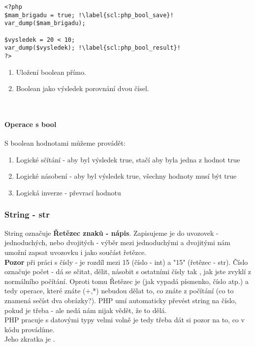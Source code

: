 \begin{minipage}[t]{.45\textwidth}
\begin{code}
\begin{verbatim}
<?php 
$mam_brigadu = true; !\label{scl:php_bool_save}!
var_dump($mam_brigadu);

$vysledek = 20 < 10;
var_dump($vysledek); !\label{scl:php_bool_result}!
?>
\end{verbatim}

\label{code:typy_bool}
\end{code}
\end{minipage}
\begin{minipage}[t]{.45\textwidth}
\begin{enumerate}
\item[ř. \ref{scl:php_bool_save}:] Uložení boolean přímo.
\item[ř. \ref{scl:php_bool_save}:] Boolean jako výsledek porovnání dvou čísel.
\end{enumerate}
\end{minipage}\\ 

\paragraph{Operace s bool}
S boolean hodnotami můžeme provádět:
\begin{enumerate}
\item[or] Logické sčítání - aby byl výsledek true, stačí aby byla jedna z hodnot true
\item[and] Logické násobení - aby byl výsledek true, všechny hodnoty musí být true
\item[not] Logická inverze - převrací hodnotu
\end{enumerate}

\subsubsection{String - str}
String označuje \textbf{Řetězec znaků - nápis}. Zapisujeme je do uvozovek - jednoduchých, nebo dvojitých - výběr mezi jednoduchými a dvojitými nám umožní zapsat uvozovku i jako součást řetězce.\\
\textbf{Pozor} při práci s čísly - je rozdíl mezi 15 (číslo - int) a "15" (řetězec - str). Číslo označuje počet - dá se sčitat, dělit, násobit s ostatními čísly tak , jak jste zvyklí z normálního počítání. Oproti tomu Řetězec je  (jak vypadá písmenko, číslo atp.) a tedy operace, které znáte (+,*) nebudou dělat to, co znáte z počítání (co to znamená sečíst dva obrázky?). PHP umí automaticky převést string na číslo, pokud je třeba - ale nedá nám nijak vědět, že to dělá.\\
PHP pracuje s datovými typy velmi volně je tedy třeba dát si pozor na to, co v kódu provádíme.\\
Jeho zkratka je .\\

